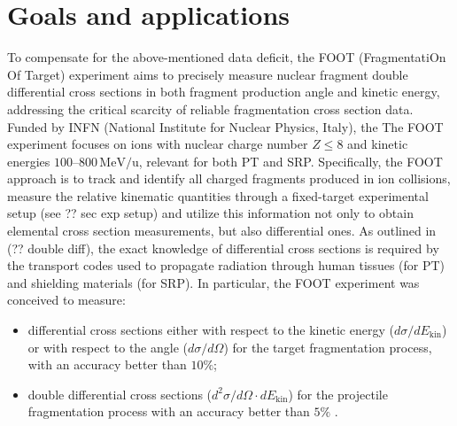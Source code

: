 \section{Goals and applications}\label{sec:foot_aim}
To compensate for the above-mentioned data deficit, the FOOT (FragmentatiOn Of Target) experiment aims to precisely measure nuclear fragment double differential cross sections in both fragment production angle and kinetic energy, addressing the critical scarcity of reliable fragmentation cross section data. Funded by INFN (National Institute for Nuclear Physics, Italy), the The FOOT experiment focuses on ions with nuclear charge number $Z\leq8$ and kinetic energies $100$--$800\,\mathrm{MeV/u}$, relevant for both PT and SRP. Specifically, the FOOT approach is to track and identify all charged fragments produced in ion collisions, measure the relative kinematic quantities through a fixed-target experimental setup (see ?? sec exp setup) and utilize this information not only to obtain elemental cross section measurements, but also differential ones. As outlined in (?? double diff), the exact knowledge of differential cross sections is required by the transport codes used to propagate radiation through human tissues (for PT) and shielding materials (for SRP). In particular, the FOOT experiment was conceived to measure:
\begin{itemize}
	\item differential cross sections either with respect to the kinetic energy ($d\sigma/dE_{\text{kin}}$) or with respect to the angle ($d\sigma/d\Omega$) for the target fragmentation process, with an accuracy better than $10\%$;
	\item double differential cross sections ($d^2\sigma/d\Omega\cdot dE_{\text{kin}}$) for the projectile fragmentation process with an accuracy better than $5\%$ \cite{measurement_impact_foot}.
\end{itemize}
